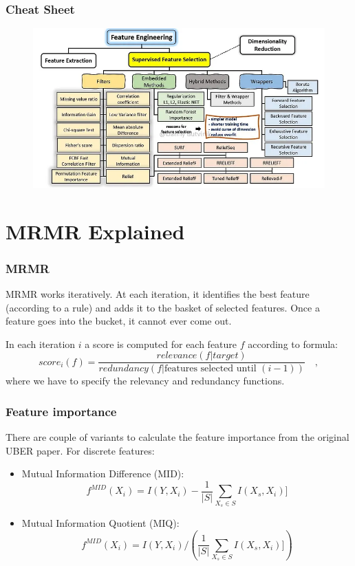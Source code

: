 \documentclass{beamer}
\begin{document}
    \begin{frame}
        \frametitle{Cheat Sheet}
        \begin{figure}
            \begin{center}
                \includegraphics[scale=0.3]{cheat_sheet.png}
            \end{center}
        \end{figure}
    \end{frame}


    \section{MRMR Explained}
    \begin{frame}
        \frametitle{MRMR}
        MRMR works iteratively. At each iteration, it identifies the best feature (according to a
        rule) and adds it to the basket of selected features. Once a feature goes into the bucket,
        it cannot ever come out.
        \pause

        In each iteration $i$ a score is computed for each feature $f$ according to formula:
        \[
            score_i (f) = \frac{relevance(f|target)}{redundancy(f|\text{features selected until } (
            i-1))} \quad ,
        \]
        where we have to specify the relevancy and redundancy functions.

    \end{frame}

    \begin{frame}
        \frametitle{Feature importance}
        There are couple of variants to calculate the feature importance from the original UBER
        paper. For discrete features:
        \begin{itemize}
            \item Mutual Information Difference (MID):
            \[
                f^{MID}(X_i) = I(Y, X_i) - \frac{1}{|S|} \sum_{X_s \in S} I(X_s, X_i)]
            \]
            \pause
            \item Mutual Information Quotient (MIQ):
            \[
                f^{MID}(X_i) = I(Y, X_i) / \left( \frac{1}{|S|} \sum_{X_s \in S} I(X_s, X_i)] \right)
            \]
        \end{itemize}
    \end{frame}
\end{document}
